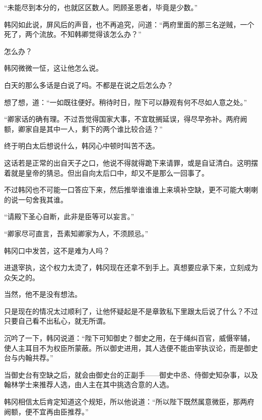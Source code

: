 “未能尽到本分的，也就区区数人。罔顾圣恩者，毕竟是少数。”

韩冈如此说，屏风后的声音，也不再追究，问道：“两府里面的那三名逆贼，一个死了，两个流放。不知韩卿觉得该怎么办？”

怎么办？

韩冈微微一怔，这让他怎么说。

白天的那么多话是白说了吗。不都是在说之后怎么办？

想了想，道：“一如既往便好。稍待时日，陛下可以静观有何不尽如人意之处。”

“卿家话的确有理。不过吾觉得国家大事，不宜耽搁延误，得尽早弥补。两府阙额，卿家自是其中一人，剩下的两个谁比较合适？”

终于明白太后想说什么，韩冈心中顿时叫苦不迭。

这话若是正常的出自天子之口，他说不得就得跪下来请罪，或是自证清白。这明摆着就是皇帝的猜忌。但出自向太后口中，却又不是那么一回事了。

不过韩冈也不可能一口答应下来，然后推举谁谁谁上来填补空缺，更不可能大喇喇的说一句舍我其谁。

“请殿下圣心自断，此非是臣等可以妄言。”

“卿家尽可直言，吾素知卿家为人，不须顾忌。”

韩冈口中发苦，这不是难为人吗？

进退宰执，这个权力太烫了，韩冈现在还拿不到手上。真想要应承下来，立刻成为众矢之的。

当然，他不是没有想法。

只是现在的情况太过顺利了，让他怀疑起是不是章敦私下里跟太后说了什么？不过只要自己看不出私心，就无所谓。

沉吟了一下，韩冈说道：“陛下可知御史？御史之用，在于绳纠百官，威慑宰辅，使人主耳目不为权臣所蒙蔽。所以御史进用，其人选便不能由宰执议论，而是御史台与内翰共荐。”

当御史台有空缺之后，就会由御史台的正副手——御史中丞、侍御史知杂事，以及翰林学士来推荐人选，由人主在其中挑选合意的人选。

韩冈相信太后肯定知道这个规矩，所以他说道：“所以陛下既然属意微臣，那两府阙额，便不宜再由臣推荐。”

